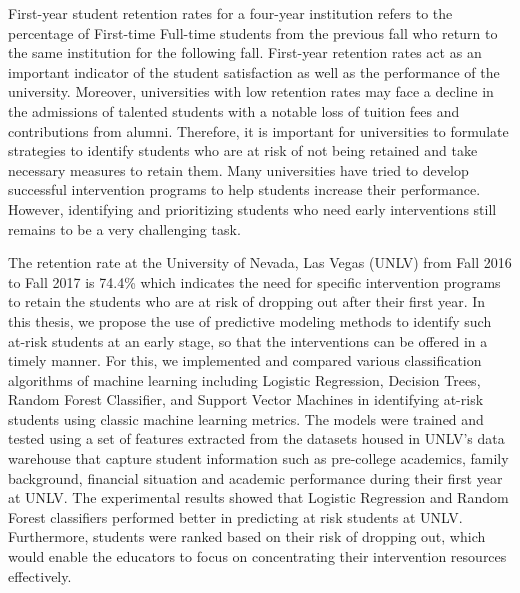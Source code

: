 \documentclass[11pt,openright]{report}
\begin{document}
\thesistitlepage
\copyrightpage

\newpage

\electronicapprovalpage


\begin{thesisabstract}
First-year student retention rates for a four-year institution refers to the percentage of First-time Full-time students from the previous fall who return to the same institution for the following fall. First-year retention rates act as an important indicator of the student satisfaction as well as the performance of the university. Moreover, universities with low retention rates may face a decline in the admissions of talented students with a notable loss of tuition fees and contributions from alumni. Therefore, it is important for universities to formulate strategies to identify students who are at risk of not being retained and take necessary measures to retain them. Many universities have tried to develop successful intervention programs to help students increase their performance. However, identifying and prioritizing students who need early interventions still remains to be a very challenging task.    

The retention rate at the University of Nevada, Las Vegas (UNLV) from Fall 2016 to Fall 2017 is 74.4\% which indicates the need for specific intervention programs to retain the students who are at risk of dropping out after their first year. In this thesis, we propose the use of predictive modeling methods to identify such at-risk students at an early stage, so that the interventions can be offered in a timely manner. For this, we implemented and compared various classification algorithms of machine learning including Logistic Regression, Decision Trees, Random Forest Classifier, and Support Vector Machines in identifying at-risk students using classic machine learning metrics. The models were trained and tested using a set of features extracted from the datasets housed in UNLV's data warehouse that capture student information such as pre-college academics, family background, financial situation and academic performance during their first year at UNLV. The experimental results showed that Logistic Regression and Random Forest classifiers performed better in predicting at risk students at UNLV. Furthermore, students were ranked based on their risk of dropping out, which would enable the educators to focus on concentrating their intervention resources effectively. 

\end{thesisabstract}
\end{document}
